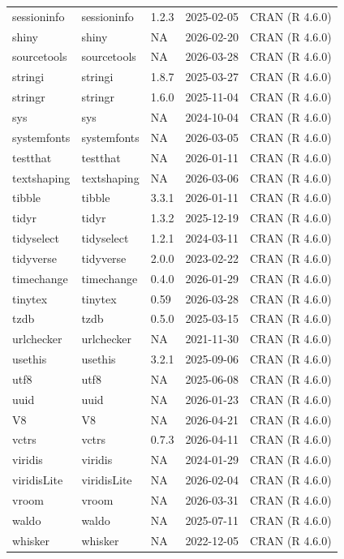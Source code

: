 \documentclass[
]{book}
\begin{document}
\begin{tabular}{lllll}
sessioninfo & sessioninfo & 1.2.3 & 2025-02-05 & CRAN (R 4.6.0)\\
shiny & shiny & NA & 2026-02-20 & CRAN (R 4.6.0)\\
\addlinespace
sourcetools & sourcetools & NA & 2026-03-28 & CRAN (R 4.6.0)\\
stringi & stringi & 1.8.7 & 2025-03-27 & CRAN (R 4.6.0)\\
stringr & stringr & 1.6.0 & 2025-11-04 & CRAN (R 4.6.0)\\
sys & sys & NA & 2024-10-04 & CRAN (R 4.6.0)\\
systemfonts & systemfonts & NA & 2026-03-05 & CRAN (R 4.6.0)\\
\addlinespace
testthat & testthat & NA & 2026-01-11 & CRAN (R 4.6.0)\\
textshaping & textshaping & NA & 2026-03-06 & CRAN (R 4.6.0)\\
tibble & tibble & 3.3.1 & 2026-01-11 & CRAN (R 4.6.0)\\
tidyr & tidyr & 1.3.2 & 2025-12-19 & CRAN (R 4.6.0)\\
tidyselect & tidyselect & 1.2.1 & 2024-03-11 & CRAN (R 4.6.0)\\
\addlinespace
tidyverse & tidyverse & 2.0.0 & 2023-02-22 & CRAN (R 4.6.0)\\
timechange & timechange & 0.4.0 & 2026-01-29 & CRAN (R 4.6.0)\\
tinytex & tinytex & 0.59 & 2026-03-28 & CRAN (R 4.6.0)\\
tzdb & tzdb & 0.5.0 & 2025-03-15 & CRAN (R 4.6.0)\\
urlchecker & urlchecker & NA & 2021-11-30 & CRAN (R 4.6.0)\\
\addlinespace
usethis & usethis & 3.2.1 & 2025-09-06 & CRAN (R 4.6.0)\\
utf8 & utf8 & NA & 2025-06-08 & CRAN (R 4.6.0)\\
uuid & uuid & NA & 2026-01-23 & CRAN (R 4.6.0)\\
V8 & V8 & NA & 2026-04-21 & CRAN (R 4.6.0)\\
vctrs & vctrs & 0.7.3 & 2026-04-11 & CRAN (R 4.6.0)\\
\addlinespace
viridis & viridis & NA & 2024-01-29 & CRAN (R 4.6.0)\\
viridisLite & viridisLite & NA & 2026-02-04 & CRAN (R 4.6.0)\\
vroom & vroom & NA & 2026-03-31 & CRAN (R 4.6.0)\\
waldo & waldo & NA & 2025-07-11 & CRAN (R 4.6.0)\\
whisker & whisker & NA & 2022-12-05 & CRAN (R 4.6.0)\\

\end{tabular}
\end{document}
